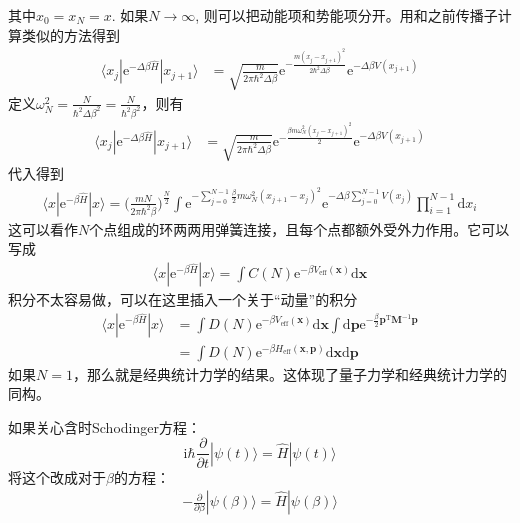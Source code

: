         其中$x_0=x_N = x$. 如果$N \to \infty$, 则可以把动能项和势能项分开。用和之前传播子计算类似的方法得到
        \begin{align*}
            \langle x_j|\mathrm{e}^{-\Delta \beta \hat{H}} |x_{j+1} \rangle &= \sqrt{\frac m{2\pi \hbar^2 \Delta \beta}} \mathrm{e}^{-\frac {m(x_j- x_{j+1})^2}{2\hbar^2 \Delta \beta}} \mathrm{e}^{-\Delta \beta V(x_{j+1})}
        \end{align*}
        定义$\omega_N^2 = \frac N{\hbar^2 \Delta \beta^2} = \frac N{\hbar^2 \beta^2}$，则有
        \begin{align*}
            \langle x_j|\mathrm{e}^{-\Delta \beta \hat{H}} |x_{j+1} \rangle &= \sqrt{\frac m{2\pi \hbar^2 \Delta \beta}} \mathrm{e}^{-\frac {\beta m\omega_N^2(x_j- x_{j+1})^2}{2}} \mathrm{e}^{-\Delta \beta V(x_{j+1})}
        \end{align*}
        代入得到 
        \begin{align*}
            \langle x|\mathrm{e}^{-\beta \hat{H}}|x\rangle  = \bigg(\frac {mN}{2\pi \hbar^2 \beta}\bigg)^{\frac N2} \int \mathrm{e}^{-\sum_{j=0}^{N-1} \frac {\beta}2 m \omega_N^2 (x_{j+1} - x_j)^2} \mathrm{e}^{-\Delta \beta \sum_{j=0}^{N-1}V(x_j)}\prod_{i=1}^{N-1}\mathrm{d}x_i
        \end{align*}
        这可以看作$N$个点组成的环两两用弹簧连接，且每个点都额外受外力作用。它可以写成
        \begin{align*}
            \langle x|\mathrm{e}^{-\beta \hat{H}}|x\rangle  = \int C(N) \mathrm{e}^{-\beta V_{\mathrm{eff}}(\bm{x})} \mathrm{d}\bm{x}
        \end{align*}
        积分不太容易做，可以在这里插入一个关于“动量”的积分
        \begin{align*}
            \langle x|\mathrm{e}^{-\beta \hat{H}}|x\rangle  &= \int D(N) \mathrm{e}^{-\beta V_{\mathrm{eff}}(\bm{x})} \mathrm{d}\bm{x} \int \mathrm{d}\bm{p} \mathrm{e}^{-\frac {\beta}2 \bm{p}^{\mathrm{T}}\bm{M}^{-1} \bm{p}}\\
            &= \int D(N) \mathrm{e}^{-\beta H_{\mathrm{eff}}(\bm{x,p})} \mathrm{d}\bm{x} \mathrm{d}\bm{p}
        \end{align*}
        如果$N=1$，那么就是经典统计力学的结果。这体现了量子力学和经典统计力学的同构。

        如果关心含时Schodinger方程：
        \begin{equation*}
            \mathrm{i}\hbar \frac {\partial}{\partial t} | \psi(t) \rangle = \hat{H}|\psi(t) \rangle
        \end{equation*}
        将这个改成对于$\beta$的方程：
        \begin{align*}
            -\frac {\partial}{\partial \beta} |\psi(\beta) \rangle = \hat{H} |\psi(\beta) \rangle
        \end{align*}


